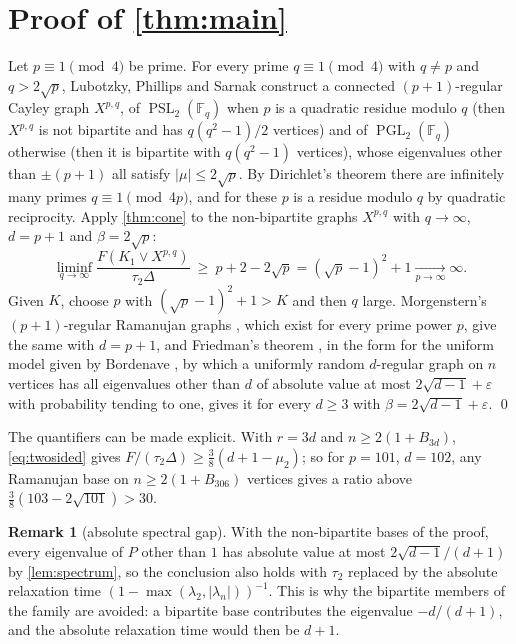 \documentclass[11pt]{amsart}
\theoremstyle{definition}
\newtheorem{remark}[theorem]{Remark}
\newcommand{\F}{\mathbb{F}}
\DeclareMathOperator{\PSL}{PSL}
\DeclareMathOperator{\PGL}{PGL}
\begin{document}
\section{Proof of \texorpdfstring{\cref{thm:main}}{the main theorem}}

Let $p\equiv1\pmod4$ be prime. For every prime $q\equiv1\pmod4$ with $q\ne p$ and $q>2\sqrt p$, Lubotzky, Phillips and Sarnak \cite{LPS} construct a connected $(p+1)$-regular Cayley graph $X^{p,q}$, of $\PSL_2(\F_q)$ when $p$ is a quadratic residue modulo $q$ (then $X^{p,q}$ is not bipartite and has $q(q^2-1)/2$ vertices) and of $\PGL_2(\F_q)$ otherwise (then it is bipartite with $q(q^2-1)$ vertices), whose eigenvalues other than $\pm(p+1)$ all satisfy $|\mu|\le2\sqrt p$. By Dirichlet's theorem there are infinitely many primes $q\equiv1\pmod{4p}$, and for these $p$ is a residue modulo $q$ by quadratic reciprocity. Apply \cref{thm:cone} to the non-bipartite graphs $X^{p,q}$ with $q\to\infty$, $d=p+1$ and $\beta=2\sqrt p$:
\[
\liminf_{q\to\infty}\frac{F(K_1\vee X^{p,q})}{\tau_2\Delta}\ \ge\ p+2-2\sqrt p=(\sqrt p-1)^2+1\xrightarrow[p\to\infty]{}\infty .
\]
Given $K$, choose $p$ with $(\sqrt p-1)^2+1>K$ and then $q$ large. Morgenstern's $(p+1)$-regular Ramanujan graphs \cite{Morgenstern}, which exist for every prime power $p$, give the same with $d=p+1$, and Friedman's theorem \cite{Friedman}, in the form for the uniform model given by Bordenave \cite[Theorem~1]{Bordenave}, by which a uniformly random $d$-regular graph on $n$ vertices has all eigenvalues other than $d$ of absolute value at most $2\sqrt{d-1}+\varepsilon$ with probability tending to one, gives it for every $d\ge3$ with $\beta=2\sqrt{d-1}+\varepsilon$. \qed

The quantifiers can be made explicit. With $r=3d$ and $n\ge2(1+B_{3d})$, \eqref{eq:twosided} gives $F/(\tau_2\Delta)\ge\frac38(d+1-\mu_2)$; so for $p=101$, $d=102$, any Ramanujan base on $n\ge2(1+B_{306})$ vertices gives a ratio above $\frac38(103-2\sqrt{101})>30$.

\begin{remark}[absolute spectral gap]
With the non-bipartite bases of the proof, every eigenvalue of $P$ other than $1$ has absolute value at most $2\sqrt{d-1}/(d+1)$ by \cref{lem:spectrum}, so the conclusion also holds with $\tau_2$ replaced by the absolute relaxation time $(1-\max(\lambda_2,|\lambda_n|))^{-1}$. This is why the bipartite members of the family are avoided: a bipartite base contributes the eigenvalue $-d/(d+1)$, and the absolute relaxation time would then be $d+1$.
\end{remark}
\end{document}
